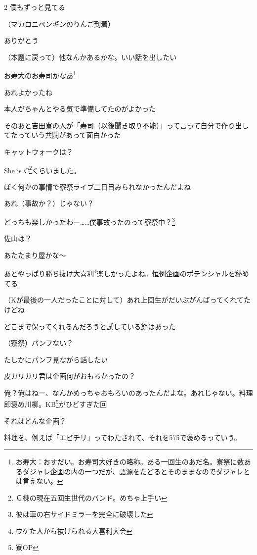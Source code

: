 \begin{multicols}{2}
 僕もずっと見てる

（マカロニペンギンのりんご到着）

 ありがとう

 （本題に戻って）他なんかあるかな。いい話を出したい

 お寿大のお寿司かなあ\footnote{お寿大：おすだい。お寿司大好きの略称。ある一回生のあだ名。寮祭に数あるダジャレ企画の内の一つだが、語源をたどるとそのままなのでダジャレとは言えない。}

 あれよかったね

 本人がちゃんとやる気で準備してたのがよかった

 そのあと吉田寮の人が「寿司（以後聞き取り不能）」って言って自分で作り出してたっていう共闘があって面白かった

 キャットウォークは？

 She is C\footnote{Ｃ棟の現在五回生世代のバンド。めちゃ上手い}くらいました。

 ぼく何かの事情で寮祭ライブ二日目みられなかったんだよね

 あれ（事故か？）じゃない？

 どっちも楽しかったわー……僕事故ったのって寮祭中？\footnote{彼は車の右サイドミラーを完全に破壊した}

 佐山は？

 あたたまり屋かな～

 あとやっぱり勝ち抜け大喜利\footnote{ウケた人から抜けられる大喜利大会}楽しかったよね。恒例企画のポテンシャルを秘めてる

 （Kが最後の一人だったことに対して）あれ上回生がだいぶがんばってくれてたけどね

 どこまで保ってくれるんだろうと試している節はあった

 （寮祭）パンフない？

 たしかにパンフ見ながら話したい

 皮ガリガリ君は企画何がおもろかったの？

 俺？俺はねー、なんかめっちゃおもろいのあったんだよな。あれじゃない。料理即褒め川柳。KB\footnote{寮OP}がひどすぎた回

 それはどんな企画？

 料理を、例えば「エビチリ」ってわたされて、それを575で褒めるっていう。


\end{multicols}
